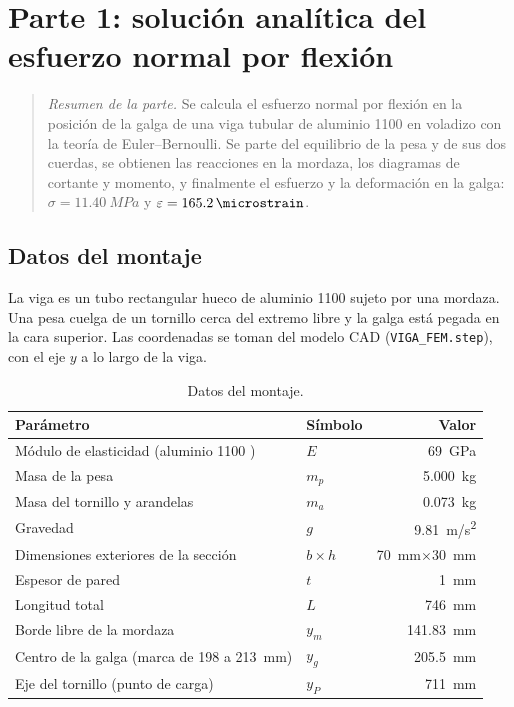 \documentclass[11pt,a4paper]{article}
\begin{document}
\section{Parte 1: soluci\'on anal\'itica del esfuerzo normal por flexi\'on}
\begin{quote}\small\textit{Resumen de la parte.} Se calcula el esfuerzo normal por flexi\'on en la posici\'on de la galga de una viga tubular de aluminio 1100 en voladizo con la teor\'ia de Euler--Bernoulli. Se parte del equilibrio de la pesa y de sus dos cuerdas, se obtienen las reacciones en la mordaza, los diagramas de cortante y momento, y finalmente el esfuerzo y la deformaci\'on en la galga: $\sigma=\SI{11,40}{MPa}$ y $\varepsilon=\SI{165,2}{\microstrain}$.\end{quote}

\subsection{Datos del montaje}
La viga es un tubo rectangular hueco de aluminio 1100 sujeto por una mordaza. Una pesa cuelga de un tornillo cerca del extremo libre y la galga est\'a pegada en la cara superior. Las coordenadas se toman del modelo CAD (\texttt{VIGA\_FEM.step}), con el eje $y$ a lo largo de la viga.

\begin{table}[H]
\centering
\caption{Datos del montaje.}
\begin{tabular}{llr}
\toprule
Par\'ametro & S\'imbolo & Valor \\
\midrule
M\'odulo de elasticidad (aluminio 1100 \cite{asm}) & $E$ & \SI{69}{GPa} \\
Masa de la pesa & $m_p$ & \SI{5,000}{kg} \\
Masa del tornillo y arandelas & $m_a$ & \SI{0,073}{kg} \\
Gravedad & $g$ & \SI{9,81}{m/s^2} \\
Dimensiones exteriores de la secci\'on & $b\times h$ & \SI{70}{mm}$\times$\SI{30}{mm} \\
Espesor de pared & $t$ & \SI{1}{mm} \\
Longitud total & $L$ & \SI{746}{mm} \\
Borde libre de la mordaza & $y_m$ & \SI{141,83}{mm} \\
Centro de la galga (marca de 198 a \SI{213}{mm}) & $y_g$ & \SI{205,5}{mm} \\
Eje del tornillo (punto de carga) & $y_P$ & \SI{711}{mm} \\
\bottomrule
\end{tabular}
\end{table}
\end{document}
